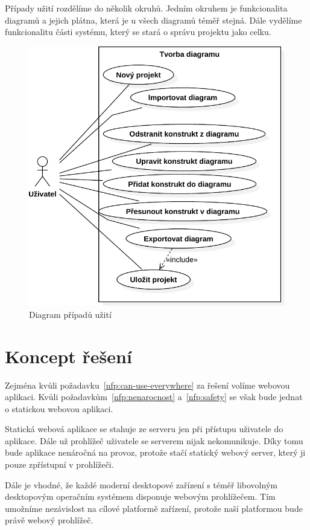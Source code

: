 Případy užití rozdělíme do několik okruhů.
Jedním okruhem je funkcionalita diagramů a jejich plátna, která je u všech diagramů téměř stejná.
Dále vydělíme funkcionalitu části systému, který se stará o správu projektu jako celku.

\begin{figure}[!htb]
  \centering
  \includegraphics[width=\maxwidth{0.7\textwidth}]{../img/diagrams/use-case-diagram.pdf}
  \caption{Diagram případů užití}
  \label{fig:use-case-diagram}
\end{figure}

\section{Koncept řešení}

Zejména kvůli požadavku~\ref{nfp:can-use-everywhere} za řešení volíme webovou aplikaci.
Kvůli požadavkům~\ref{nfp:nenarocnost} a~\ref{nfp:safety} se však bude jednat o statickou webovou aplikaci.

Statická webová aplikace se stahuje ze serveru jen při přístupu uživatele do aplikace.
Dále už prohlížeč uživatele se serverem nijak nekomunikuje.
Díky tomu bude aplikace nenáročná na provoz, protože stačí statický webový server, který ji pouze zpřístupní v prohlížeči.

Dále je vhodné, že každé moderní desktopové zařízení s téměř libovolným desktopovým operačním systémem disponuje webovým prohlížečem.
Tím umožníme nezávislost na cílové platformě zařízení, protože naší platformou bude právě webový prohlížeč.

